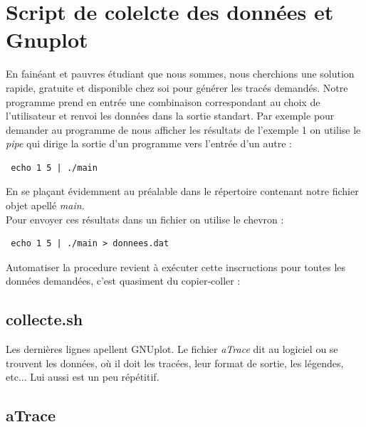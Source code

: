 \documentclass[a4paper,11pt]{article}
\begin{document}


  \section{Script de colelcte des données et Gnuplot}
    En fainéant et pauvres étudiant que nous sommes, nous cherchions une solution rapide, gratuite et disponible chez soi pour générer les tracés 
demandés. Notre programme prend en entrée une combinaison correspondant au choix de l'utilisateur et renvoi les données dans la sortie standart.
Par exemple pour demander au programme de nous afficher les résultats de l'exemple 1 on utilise le \textit{pipe} qui dirige la sortie d'un programme 
vers l'entrée d'un autre :

\begin{lstlisting}
 echo 1 5 | ./main
\end{lstlisting}

En se plaçant évidemment au préalable dans le répertoire contenant notre fichier objet apellé \textit{main}.\\
Pour envoyer ces résultats dans un fichier on utilise le chevron :

\begin{lstlisting}
 echo 1 5 | ./main > donnees.dat
\end{lstlisting}

Automatiser la procedure revient à exécuter cette inscructions pour toutes les données demandées, c'est quasiment du copier-coller :

  \subsection{collecte.sh}
    

Les dernières lignes apellent GNUplot. Le fichier \textit{aTrace} dit au logiciel ou se trouvent les données, où il doit les tracées,
leur format de sortie, les légendes, etc... Lui aussi est un peu répétitif.


  \subsection{aTrace}
    
\end{document}
